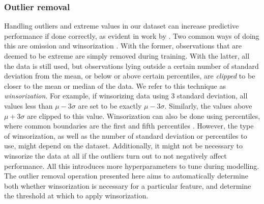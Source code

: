 \documentclass{statsmsc}
\begin{document}
{%
\subsubsection{Outlier removal}%
\label{ssub:Outlier removal}

Handling outliers and extreme values in our dataset can increase predictive performance if done
correctly, as evident in work by \cite{outlier_wind}. 
Two common ways of doing this are omission and winsorization
\citep{winsorization}. With the former, observations that are deemed to be extreme are simply
removed during training. With the latter, all the data is still used, but observations lying
outside a certain number of standard deviation from the mean, or below or above certain
percentiles, are \textit{clipped} to be closer to the mean or median of the data. We refer to this
technique as \textit{winsorization}.
For example, if winsorizing data using 3 standard deviation, all values less than
$\mu-3\sigma$ are set to be exactly $\mu-3\sigma$. Similarly, the values above
$\mu+3\sigma$ are clipped to this value. Winsorization can also be done using percentiles,
where common boundaries are the first and fifth percentiles \citep{winsorization}.
However, the type of winsorization, as well as the number of standard deviation
or percentiles to use, might depend on the dataset. Additionally, it might not
be necessary to winsorize the data at all if the outliers turn out to not
negatively affect performance. All this introduces more hyperparameters to tune
during modelling. The outlier removal operation presented here aims to automatically  determine both
whether winsorization is necessary for a particular feature, and determine the threshold at
which to apply winsorization.

}
\end{document}
